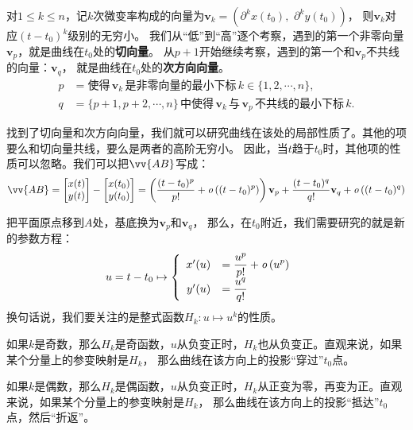 \documentclass[12pt,UTF8]{ctexbook}
\newcommand{\olim}[1]{\mathit{o}\left(#1\right)}  %
\theoremstyle{definition}
\theoremstyle{plain}
\begin{document}
对$1\leqslant k\leqslant n$，记$k$次微变率构成的向量为$\mathbf{v}_k = (\partial^k x(t_0) ,\,\, \partial^k y(t_0))$，
则$\mathbf{v}_k$对应$(t - t_0)^k$级别的无穷小。
我们从“低”到“高”逐个考察，遇到的第一个非零向量$\mathbf{v}_p$，就是曲线在$t_0$处的\textbf{切向量}。
从$p+1$开始继续考察，遇到的第一个和$\mathbf{v}_p$不共线的向量：$\mathbf{v}_q$，
就是曲线在$t_0$处的\textbf{次方向向量}。
\begin{align*}
    p &= \mbox{使得}\,\mathbf{v}_k\,\mbox{是非零向量的最小下标}\,k\in\{1,2,\cdots, n\}, \\
    q &= \{p+1,p+2,\cdots, n\}\,\mbox{中使得}\,\mathbf{v}_k\,\mbox{与}\,\mathbf{v}_p\,\mbox{不共线的最小下标}\, k. 
\end{align*}

找到了切向量和次方向向量，我们就可以研究曲线在该处的局部性质了。其他的项要么和切向量共线，要么是两者的高阶无穷小。
因此，当$t$趋于$t_0$时，其他项的性质可以忽略。我们可以把$\vv{AB}$写成：
$$
\vv{AB} = \begin{bmatrix} x(t) \\ y(t) \end{bmatrix} - \begin{bmatrix} x(t_0) \\ y(t_0) \end{bmatrix}
=
\left(\frac{(t - t_0)^p}{p!} + \olim{(t - t_0)^p}\right)\mathbf{v}_p
+
\frac{(t - t_0)^q}{q!}\mathbf{v}_q
+
\olim{(t - t_0)^q}
$$

把平面原点移到$A$处，基底换为$\mathbf{v}_p$和$\mathbf{v}_q$，
那么，在$t_0$附近，我们需要研究的就是新的参数方程：
\begin{align*}
    u = t - t_0 &\mapsto\left\{
        \begin{array}[]{rl}
            x'(u) &\displaystyle = \frac{u^p}{p!} + \olim{u^p} \\
            y'(u) &\displaystyle = \frac{u^q}{q!} \\
        \end{array}
    \right.
\end{align*}
换句话说，我们要关注的是整式函数$H_k: u\mapsto u^k$的性质。

如果$k$是奇数，那么$H_k$是奇函数，$u$从负变正时，$H_k$也从负变正。直观来说，如果某个分量上的参变映射是$H_k$，
那么曲线在该方向上的投影“穿过”$t_0$点。

如果$k$是偶数，那么$H_k$是偶函数，$u$从负变正时，$H_k$从正变为零，再变为正。直观来说，如果某个分量上的参变映射是$H_k$，
那么曲线在该方向上的投影“抵达”$t_0$点，然后“折返”。
\end{document}
